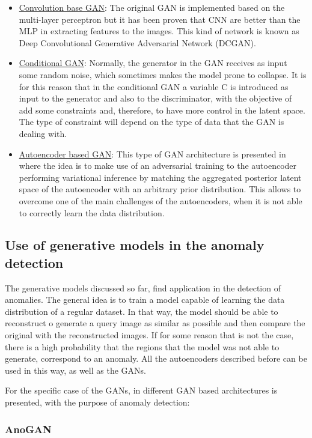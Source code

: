 \begin{itemize}
 \item \underline{Convolution base GAN}: The original GAN is implemented based on the multi-layer perceptron but it has been proven that CNN are better than the MLP in extracting features to the images. This kind of network is known as Deep Convolutional Generative Adversarial Network (DCGAN).
 \item \underline{Conditional GAN}: Normally, the generator in the GAN receives as input some random noise, which sometimes makes the model prone to collapse. It is for this reason that in the conditional GAN a variable C is introduced as input to the generator and also to the discriminator, with the objective of add some constraints and, therefore, to have more control in the latent space. The type of constraint will depend on the type of data that the GAN is dealing with.
 \item \underline{Autoencoder based GAN}: This type of GAN architecture is presented in \cite{Makhzani2015} where the idea is to make use of an adversarial training to the autoencoder performing variational inference by matching the aggregated posterior latent space of the autoencoder with an arbitrary prior distribution. This allows to overcome one of the main challenges of the autoencoders, when it is not able to correctly learn the data distribution.
\end{itemize}

\subsection{Use of generative models in the anomaly detection}

The generative models discussed so far, find application in the detection of anomalies. The general idea is to train a model capable of learning the data distribution of a regular dataset. In that way, the model should be able to reconstruct o generate a query image as similar as possible and then compare the original with the reconstructed images. If for some reason that is not the case, there is a high probability that the regions that the model was not able to generate, correspond to an anomaly. All the autoencoders described before can be used in this way, as well as the GANs.

For the specific case of the GANs, in \cite{DiMattia2019} different GAN based architectures is presented, with the purpose of anomaly detection:

\subsubsection{AnoGAN}

